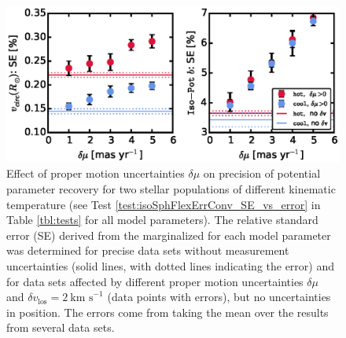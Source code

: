 
\begin{figure}[!htbp]
\centering
\includegraphics[width=\columnwidth]{figs/isoSphFlexErrConv_SE_vs_error.eps}
\caption{Effect of proper motion uncertainties $\delta \mu$ on precision of potential parameter recovery for two stellar populations of different kinematic temperature (see Test \ref{test:isoSphFlexErrConv_SE_vs_error} in Table \ref{tbl:tests} for all model parameters). The relative standard error (SE) derived from the marginalized \pdf{} for each model parameter was determined for precise data sets without measurement uncertainties (solid lines, with dotted lines indicating the error) and for data sets affected by different proper motion uncertainties $\delta \mu$ and $\delta v_\text{los}=2~\text{km s}^{-1}$ (data points with errors), but no uncertainties in position. The errors come from taking the mean over the results from several data sets.}
\label{fig:isoSphFlexErrConv_SE_vs_error}
\end{figure}



